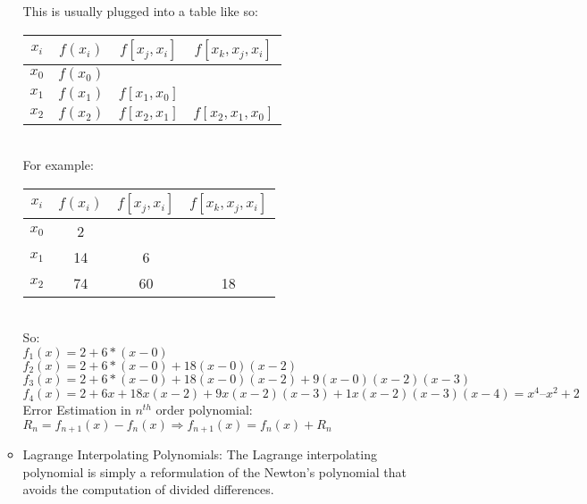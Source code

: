\documentclass[fontsize=5pt]{scrartcl}
\begin{document}
\begin{multicols}{3}
\begin{enumerate}
\begin{itemize}
              This is usually plugged into a table like so: \\
              \begin{tabular}{|c|c|c|c|}
                \hline
                $x_i$ & $f(x_i)$ & $f[x_j,x_i]$ & $f[x_k,x_j,x_i]$ \\\hline\hline
                $x_0$ & $f(x_0)$ &              &                  \\\hline
                $x_1$ & $f(x_1)$ & $f[x_1,x_0]$ &                  \\\hline
                $x_2$ & $f(x_2)$ & $f[x_2,x_1]$ & $f[x_2,x_1,x_0]$ \\\hline
                \hline
              \end{tabular} \\
              For example: \\
              \begin{tabular}{|c|c|c|c|}
                \hline
                $x_i$ & $f(x_i)$ & $f[x_j,x_i]$ & $f[x_k,x_j,x_i]$ \\\hline\hline
                $x_0$ & 2        &              &                  \\\hline
                $x_1$ & 14       & 6            &                  \\\hline
                $x_2$ & 74       & 60           & 18               \\\hline
                \hline
              \end{tabular} \\
              So: \\
              $f_1(x) = 2+6*(x-0)$\\
              $f_2(x) = 2+6*(x-0)+18(x-0)(x-2)$\\
              $f_3(x) = 2+6*(x-0)+18(x-0)(x-2)+9(x-0)(x-2)(x-3)$\\
              $f_4(x) = 2+6x+18x(x-2)+9x(x-2)(x-3)+1x(x-2)(x-3)(x-4)=x^4–x^2+2 $ \\
              
              Error Estimation in $n^{th}$ order polynomial: $R_n=f_{n+1}(x)-f_n(x)\Rightarrow f_{n+1}(x)=f_n(x)+R_n$
              
          \item Lagrange Interpolating Polynomials: The Lagrange interpolating polynomial is simply a reformulation of the 
                Newton’s polynomial that avoids the computation of divided differences.
                

\end{itemize}
\end{enumerate}
\end{multicols}
\end{document}
